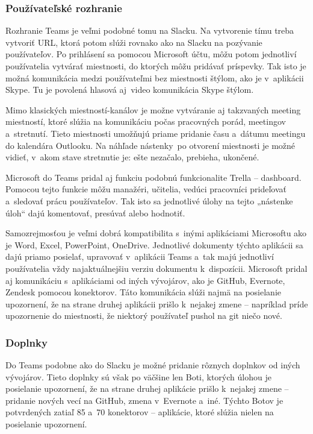 \subsubsection{Používateľské rozhranie}
\indent Rozhranie Teams je veľmi podobné tomu na Slacku. Na vytvorenie tímu treba vytvoriť URL, ktorá potom slúži rovnako ako na Slacku na pozývanie používateľov. Po prihlásení sa pomocou Microsoft účtu, môžu potom jednotliví používatelia vytvárať miestnosti, do ktorých môžu pridávať príspevky. Tak isto je možná komunikácia medzi používateľmi bez miestnosti štýlom, ako je v aplikácii Skype. Tu je povolená hlasová aj video komunikácia Skype štýlom. 

\indent Mimo klasických miestností-kanálov je možne vytváranie aj takzvaných meeting miestností, ktoré slúžia na komunikáciu počas pracovných porád, meetingov a stretnutí. Tieto miestnosti umožňujú priame pridanie času a dátumu meetingu do kalendára Outlooku. Na náhľade nástenky po otvorení miestnosti je možné vidieť, v akom stave stretnutie je: ešte nezačalo, prebieha, ukončené. 

\indent Microsoft do Teams pridal aj funkciu podobnú funkcionalite Trella – dashboard. Pomocou tejto funkcie môžu manažéri, učitelia, vedúci pracovníci prideľovať a sledovať prácu používateľov. Tak isto sa jednotlivé úlohy na tejto „nástenke úloh“ dajú komentovať, presúvať alebo hodnotiť.

\indent Samozrejmosťou je veľmi dobrá kompatibilita s inými aplikáciami Microsoftu ako je Word, Excel, PowerPoint, OneDrive. Jednotlivé dokumenty týchto aplikácii sa dajú priamo posielať, upravovať v aplikácii Teams a tak majú jednotliví používatelia vždy najaktuálnejšiu verziu dokumentu k dispozícii. Microsoft pridal aj komunikáciu s aplikáciami od iných vývojárov, ako je GitHub, Evernote, Zendesk pomocou konektorov. Táto komunikácia slúži najmä na posielanie upozornení, že na strane druhej aplikácii prišlo k nejakej zmene – napríklad príde upozornenie do miestnosti, že niektorý používateľ pushol na git niečo nové\cite{ms_teams}.  
\subsubsection{Doplnky}
\indent Do Teams podobne ako do Slacku je možné pridanie rôznych doplnkov od iných vývojárov. Tieto doplnky sú však po väčšine len Boti, ktorých úlohou je posielanie upozornení, že na strane druhej aplikácie prišlo k nejakej zmene – pridanie nových vecí na GitHub, zmena v Evernote a iné. Týchto Botov je potvrdených zatiaľ 85 a 70 konektorov – aplikácie, ktoré slúžia nielen na posielanie upozornení. 

